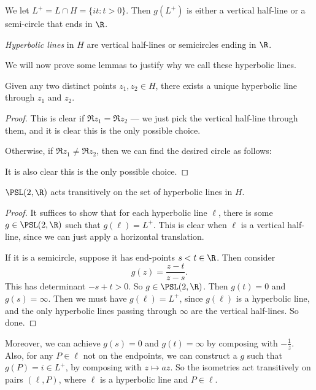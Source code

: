 \documentclass[a4paper]{article}
\begin{document}
We let $L^+ = L \cap H = \{it: t > 0\}$. Then $g(L^+)$ is either a vertical half-line or a semi-circle that ends in $\R$.

\begin{defi}
  \emph{Hyperbolic lines} in $H$ are vertical half-lines or semicircles ending in $\R$.
\end{defi}
We will now prove some lemmas to justify why we call these hyperbolic lines.

\begin{lemma}
  Given any two distinct points $z_1, z_2 \in H$, there exists a unique hyperbolic line through $z_1$ and $z_2$.
\end{lemma}

\begin{proof}
  This is clear if $\Re z_1 = \Re z_2$ --- we just pick the vertical half-line through them, and it is clear this is the only possible choice.

  Otherwise, if $\Re z_1 \not= \Re z_2$, then we can find the desired circle as follows:
  \begin{center}
  \end{center}
  It is also clear this is the only possible choice.
\end{proof}

\begin{lemma}
  $\PSL(2, \R)$ acts transitively on the set of hyperbolic lines in $H$.
\end{lemma}

\begin{proof}
  It suffices to show that for each hyperbolic line $\ell$, there is some $g \in \PSL(2, \R)$ such that $g(\ell)= L^+$. This is clear when $\ell$ is a vertical half-line, since we can just apply a horizontal translation.

  If it is a semicircle, suppose it has end-points $s < t \in \R$. Then consider
  \[
    g(z) = \frac{z - t}{z - s}.
  \]
  This has determinant $-s + t > 0$. So $g \in \PSL(2, \R)$. Then $g(t) = 0$ and $g(s) = \infty$. Then we must have $g(\ell) = L^+$, since $g(\ell)$ is a hyperbolic line, and the only hyperbolic lines passing through $\infty$ are the vertical half-lines. So done.
\end{proof}
Moreover, we can achieve $g(s) = 0$ and $g(t) = \infty$ by composing with $-\frac{1}{z}$. Also, for any $P \in \ell$ not on the endpoints, we can construct a $g$ such that $g(P) = i \in L^+$, by composing with $z \mapsto az$. So the isometries act transitively on pairs $(\ell, P)$, where $\ell$ is a hyperbolic line and $P \in \ell$.
\end{document}
